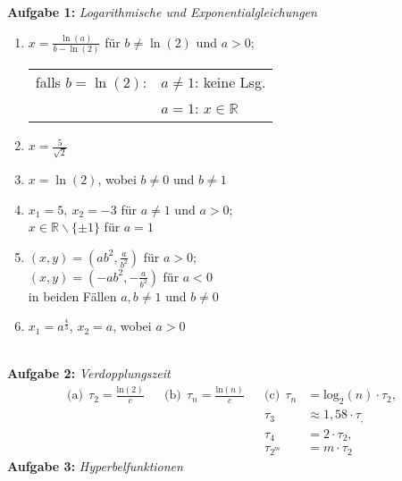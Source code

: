 
\textbf{Aufgabe 1: } \emph{Logarithmische und Exponentialgleichungen}\\[0.5cm]
\begin{minipage}[t]{0.45\linewidth}
\begin{enumerate}[label=(\alph*)]
\item $x=\frac{\ln(a)}{b-\ln(2)}$ für $b\ne\ln(2)$ und $a>0$;\\[0.2cm]\begin{tabular}{ll}
falls $b=\ln(2)$:	& $a\ne 1$: keine Lsg.\\
					& $a=1$: $x\in\mathbb{R}$
\end{tabular}
\item $x=\frac{5}{\sqrt{2}}$
\item $x=\ln(2)$, wobei $b\ne 0$ und $b\ne 1$
\end{enumerate}
\end{minipage}\hfill
\begin{minipage}[t]{0.45\linewidth}
\begin{enumerate}[resume,label=(\alph*)]\setcounter{enumi}{3}
\item $x_1=5,\ x_2=-3$ für $a\neq1$ und $a>0$;\\[0.7ex]$x\in\mathbb{R}\smallsetminus\{\pm 1\}$ für $a=1$
\item $(x,y)=( ab^2,\frac{a}{b^2} )$ für $a>0$;\\[1ex]$(x,y)=( -ab^2,-\frac{a}{b^2} )$ für $a<0$\\ in beiden Fällen $a,b\ne 1$ und $b\ne 0$
\item $x_1=a^\frac{4}{3}$, $x_2=a$, wobei $a>0$
\end{enumerate}
\end{minipage}\\[1.2cm]
%
\noindent
\textbf{Aufgabe 2: } \emph{Verdopplungszeit}
\begin{align*}
\text{(a)}\ \ \tau_2=\frac{\mathrm{ln}(2)}{c} && \text{(b)}\ \ \tau_n=\frac{\mathrm{ln}(n)}{c} && \text{(c)}\ \ \tau_n&=\mathrm{log}_2(n)\cdot\tau_2,\\
			&& && \tau_3&\approx 1,58\cdot\tau_,\\
			&& && \tau_4&=2\cdot\tau_2,\\
			&& && \tau_{2^m}&=m\cdot\tau_2
\end{align*}
%
\textbf{Aufgabe 3: } \emph{Hyperbelfunktionen}
